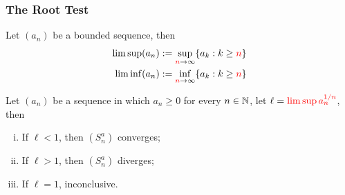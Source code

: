\documentclass[11pt]{article}
\begin{document}
	\subsubsection{The Root Test}
	
	\begin{definition}
		Let $(a_n)$ be a bounded sequence, then
		\begin{align}
			\limsup (a_n) &:= \sup_{\textcolor{red}{n} \to \infty} \{a_k : k \geq \textcolor{red}{n}\} \\
			\liminf (a_n) &:= \inf_{\textcolor{red}{n} \to \infty} \{a_k : k \geq \textcolor{red}{n}\} \\
		\end{align}
	\end{definition}
	
	\begin{theorem}
		Let $(a_n)$ be a sequence in which $a_n \geq 0$ for every $n \in \mathbb{N}$, let $\ell = \textcolor{red}{\limsup a_n^{1/n}}$, then
		\begin{enumerate}[(i)]
			\item If $\ell < 1$, then $(S^a_n)$ converges;
			\item If $\ell > 1$, then $(S^a_n)$ diverges;
			\item If $\ell = 1$, inconclusive.
		\end{enumerate}
	\end{theorem}
	
\end{document}
